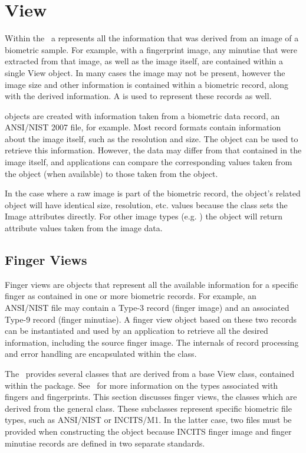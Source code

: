 %
%
\chapter{View}
\label{chp-view}
Within the \lname\ a  represents all the information that was derived from
an image of a biometric sample. For example, with a fingerprint image, any
minutiae that were extracted from that image, as well as the image itself,
are contained within a single View object. In many cases the image may not
be present, however the image size and other information is contained within
a biometric record, along with the derived information. A  is used to
represent these records as well.

 objects are created with information taken from a biometric data record,
an ANSI/NIST 2007 file, for example. Most record formats contain information
about the image itself, such as the resolution and size. The  object can
be used to retrieve this information. However, the data may differ from that
contained in the image itself, and applications can compare the corresponding
values taken from the  object (when available) to those taken from the
 object.

In the case where a raw image is part of the biometric record, the  object's
related  object will have identical size, resolution, etc. values because
the  class sets the Image attributes directly. For other image types
(e.g. ) the  object will return attribute values taken from the image
data.

\section{Finger Views}
\label{sec-fingerviews}

Finger views are objects that represent all the available information for a
specific finger as contained in one or more biometric records. For example,
an ANSI/NIST file may contain a Type-3 record (finger image) and an associated
Type-9 record (finger minutiae). A finger view object based on these two
records can be instantiated and used by an application to retrieve all the
desired information, including the source finger image. The internals of
record processing and error handling are encapsulated within the class.

The \sname\ provides several classes that are derived from a base View class,
contained within the  package. See~ for more
information
on the types associated with fingers and fingerprints. This section discusses
finger views, the classes which are derived from the general  class.
These subclasses represent specific biometric file types, such as ANSI/NIST
or INCITS/M1. In the latter case, two files must be provided when constructing
the object because INCITS finger image and finger minutiae records are defined
in two separate standards.

